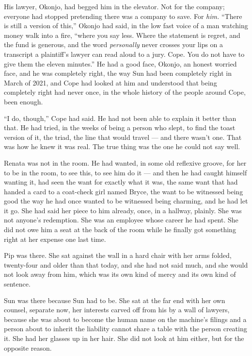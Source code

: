 \documentclass[11pt,openany]{book}
\begin{document}
His lawyer, Okonjo, had begged him in the elevator. Not for the company; everyone had stopped pretending there was a company to save. For \textit{him.} ``There is still a version of this,'' Okonjo had said, in the low fast voice of a man watching money walk into a fire, ``where you say less. Where the statement is regret, and the fund is generous, and the word \textit{personally} never crosses your lips on a transcript a plaintiff's lawyer can read aloud to a jury. Cope. You do not have to give them the eleven minutes.'' He had a good face, Okonjo, an honest worried face, and he was completely right, the way Sun had been completely right in March of 2021, and Cope had looked at him and understood that being completely right had never once, in the whole history of the people around Cope, been enough.

``I do, though,'' Cope had said. He had not been able to explain it better than that. He had tried, in the weeks of being a person who slept, to find the toast version of it, the triad, the line that would travel --- and there wasn't one. That was how he knew it was real. The true thing was the one he could not say well.

Renata was not in the room. He had wanted, in some old reflexive groove, for her to be in the room, to see this, to see him do it --- and then he had caught himself wanting it, had seen the want for exactly what it was, the same want that had handed a card to a coat-check girl named Bryce, the want to be witnessed being good the way he had once wanted to be witnessed being charming, and he had let it go. She had said her piece to him already, once, in a hallway, plainly. She was not anyone's redemption. She was an employee whose career he had spent. She did not owe him a seat at the back of the room while he finally got something right at her expense one last time.

Pip was there. She sat against the wall in a hard chair with her arms folded, twenty-four and older than that today, and she had not said much, and she would not look away from him, which was its own kind of mercy and its own kind of sentence.

Sun was there because Sun had to be. She sat at the far end with her own counsel, separate now, her interests carved off from his by a wall of lawyers, because she was about to become the human name on the machine's filings and a person about to inherit the liability cannot share a table with the person creating it. She had her glasses up in her hair. She did not look at him either, but for the opposite reason.
\end{document}
